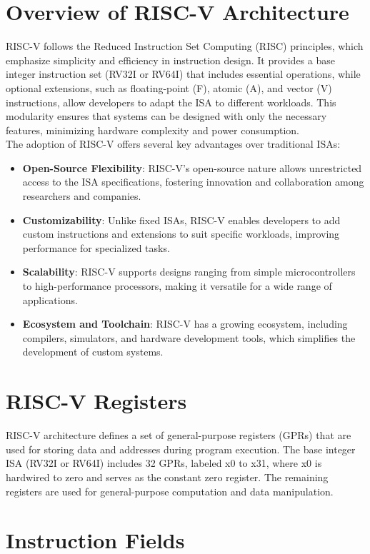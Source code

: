 \documentclass[12pt]{report}
\begin{document}
\section{Overview of RISC-V Architecture}
RISC-V follows the Reduced Instruction Set Computing (RISC) principles, which emphasize simplicity and efficiency in instruction design. It provides a base integer instruction set (RV32I or RV64I) that includes essential operations, while optional extensions, such as floating-point (F), atomic (A), and vector (V) instructions, allow developers to adapt the ISA to different workloads. This modularity ensures that systems can be designed with only the necessary features, minimizing hardware complexity and power consumption.\\
The adoption of RISC-V offers several key advantages over traditional ISAs:
\begin{itemize}
    \item \textbf{Open-Source Flexibility}: RISC-V's open-source nature allows unrestricted access to the ISA specifications, fostering innovation and collaboration among researchers and companies.
    \item \textbf{Customizability}: Unlike fixed ISAs, RISC-V enables developers to add custom instructions and extensions to suit specific workloads, improving performance for specialized tasks.
    \item \textbf{Scalability}: RISC-V supports designs ranging from simple microcontrollers to high-performance processors, making it versatile for a wide range of applications.
    \item \textbf{Ecosystem and Toolchain}: RISC-V has a growing ecosystem, including compilers, simulators, and hardware development tools, which simplifies the development of custom systems.
\end{itemize}

\section{RISC-V Registers}

RISC-V architecture defines a set of general-purpose registers (GPRs) that are used for storing data and addresses during program execution. The base integer ISA (RV32I or RV64I) includes 32 GPRs, labeled x0 to x31, where x0 is hardwired to zero and serves as the constant zero register. The remaining registers are used for general-purpose computation and data manipulation.

\section{Instruction Fields}
\end{document}
